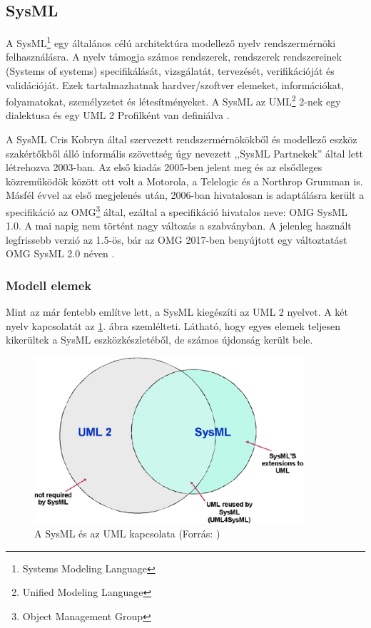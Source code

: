 \subsection{SysML}
A SysML\footnote{Systems Modeling Language} egy általános célú architektúra modellező nyelv rendszermérnöki felhasználásra.
A nyelv támogja számos rendszerek, rendszerek rendszereinek (Systems of systems) specifikálását, vizsgálatát, tervezését, verifikációját és validációját.
Ezek tartalmazhatnak hardver/szoftver elemeket, információkat, folyamatokat, személyzetet és létesítményeket.
A SysML az UML\footnote{Unified Modeling Language} 2-nek egy dialektusa és egy UML 2 Profilként van definiálva \cite{sysml}.

A SysML Cris Kobryn által szervezett rendszermérnökökből és modellező eszköz szakértőkből álló informális szövettség úgy nevezett ,,SysML Partnekek'' által lett létrehozva 2003-ban.
Az első kiadás 2005-ben jelent meg és az elsődleges közreműködök között ott volt a Motorola, a Telelogic és a Northrop Grumman is.
Másfél évvel az első megjelenés után, 2006-ban hivatalosan is adaptálásra került a specifikáció az OMG\footnote{Object Management Group} által, ezáltal a specifikáció hivatalos neve: OMG SysML 1.0.
A mai napig nem történt nagy változás a szabványban. A jelenleg használt legfrissebb verzió az 1.5-ös, bár az OMG 2017-ben benyújtott egy változtatást OMG SysML 2.0 néven \cite{sysml-partner}.

\subsubsection{Modell elemek}
Mint az már fentebb említve lett, a SysML kiegészíti az UML 2 nyelvet.
A két nyelv kapcsolatát az \ref{fig:sysUML}. ábra szemlélteti.
Látható, hogy egyes elemek teljesen kikerültek a SysML eszközkészletéből, de számos újdonság került bele.

\begin{figure}
    \footnotesize
    \centering
    \includegraphics[width=100mm, keepaspectratio]{figures/sysml_uml.jpg}
    \caption{A SysML és az UML kapcsolata (Forrás: \cite{omgsysml})}
    \label{fig:sysUML}
\end{figure}

